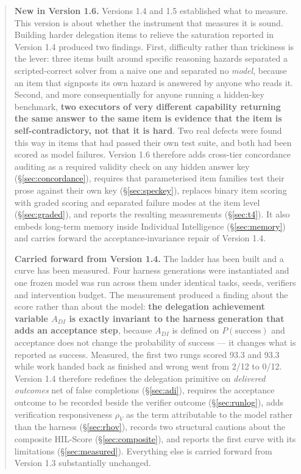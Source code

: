 \documentclass[11pt]{article}
\theoremstyle{definition}
\newcommand{\rhov}{\ensuremath{\rho_V}}
\begin{document}
\begin{abstract}
\medskip
\noindent\textbf{New in Version 1.6.} Versions 1.4 and 1.5 established what to measure. This version is about whether the instrument that measures it is sound. Building harder delegation items to relieve the saturation reported in Version 1.4 produced two findings. First, difficulty rather than trickiness is the lever: three items built around specific reasoning hazards separated a scripted-correct solver from a naive one and separated no \emph{model}, because an item that signposts its own hazard is answered by anyone who reads it. Second, and more consequentially for anyone running a hidden-key benchmark, \textbf{two executors of very different capability returning the same answer to the same item is evidence that the item is self-contradictory, not that it is hard}. Two real defects were found this way in items that had passed their own test suite, and both had been scored as model failures. Version 1.6 therefore adds cross-tier concordance auditing as a required validity check on any hidden answer key (\S\ref{sec:concordance}), requires that parameterised item families test their prose against their own key (\S\ref{sec:speckey}), replaces binary item scoring with graded scoring and separated failure modes at the item level (\S\ref{sec:graded}), and reports the resulting measurements (\S\ref{sec:t4}). It also embeds long-term memory inside Individual Intelligence (\S\ref{sec:memory}) and carries forward the acceptance-invariance repair of Version 1.4.

\medskip
\noindent\textbf{Carried forward from Version 1.4.} The ladder has been built and a curve has been measured. Four harness generations were instantiated and one frozen model was run across them under identical tasks, seeds, verifiers and intervention budget. The measurement produced a finding about the score rather than about the model: \textbf{the delegation achievement variable $A_{DI}$ is exactly invariant to the harness generation that adds an acceptance step}, because $A_{DI}$ is defined on $P(\text{success})$ and acceptance does not change the probability of success --- it changes what is reported as success. Measured, the first two rungs scored 93.3 and 93.3 while work handed back as finished and wrong went from 2/12 to 0/12. Version 1.4 therefore redefines the delegation primitive on \emph{delivered outcomes} net of false completions (\S\ref{sec:adi}), requires the acceptance outcome to be recorded beside the verifier outcome (\S\ref{sec:runlog}), adds verification responsiveness \rhov{} as the term attributable to the model rather than the harness (\S\ref{sec:rhov}), records two structural cautions about the composite HIL-Score (\S\ref{sec:composite}), and reports the first curve with its limitations (\S\ref{sec:measured}). Everything else is carried forward from Version 1.3 substantially unchanged.


\end{abstract}
\end{document}
